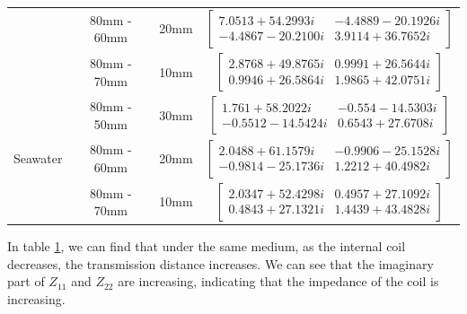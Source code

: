 \begin{table}[!t]
{\begin{tabular}{|c|c|c|c|}
                                   & 80mm - 60mm                        & 20mm              & $\begin{bmatrix} 7.0513	+54.2993i  & -4.4889	-20.1926i \\
                -4.4867	-20.2100i & 3.9114	+36.7652i\end{bmatrix}$ \Tstrut\Bstrut\\ \cline{2-4}
                                   & 80mm - 70mm                        & 10mm              & $\begin{bmatrix} 2.8768	+49.8765i & 0.9991	+26.5644i \\
                0.9946	+26.5864i & 1.9865	+42.0751i\end{bmatrix}$ \Tstrut\Bstrut\\ \hline
        \multirow{3}{*}{Seawater}  & 80mm - 50mm                        & 30mm              & $\begin{bmatrix} 1.761	+58.2022i   & -0.554	-14.5303i \\
                -0.5512	-14.5424i & 0.6543	+27.6708i\end{bmatrix}$ \Tstrut\Bstrut\\ \cline{2-4}
                                   & 80mm - 60mm                        & 20mm              & $\begin{bmatrix} 2.0488	+61.1579i  & -0.9906	-25.1528i \\
                -0.9814	-25.1736i & 1.2212	+40.4982i\end{bmatrix}$ \Tstrut\Bstrut\\ \cline{2-4}
                                   & 80mm - 70mm                        & 10mm              & $\begin{bmatrix} 2.0347	+52.4298i & 0.4957	+27.1092i \\
                0.4843	+27.1321i & 1.4439	+43.4828i\end{bmatrix}$ \Tstrut\Bstrut\\ \hline
    \end{tabular}
    }
    \renewcommand{\arraystretch}{1}
    \label{table:Z-parameters in distance}
\end{table}


In table \ref{table:Z-parameters in distance}, we can find that under the same medium, as the internal coil decreases, the transmission distance increases. We can see that the imaginary part of $Z_{11}$ and $Z_{22}$ are increasing, indicating that the impedance of the coil is increasing.

